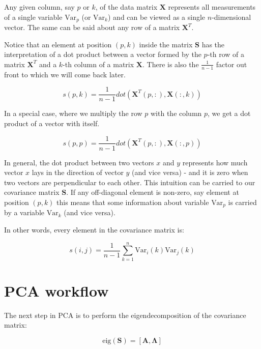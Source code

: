 \documentclass[10pt,twocolumn]{article}
\begin{document}
Any given column, say $p$ or $k$, of the data matrix $\bm{X}$ represents all measurements of a single variable $\text{Var}_p$ (or $\text{Var}_k$) and can be viewed as a single $n$-dimensional vector. The same can be said about any row of a matrix $\bm{X}^T$.

Notice that an element at position $(p,k)$ inside the matrix $\bm{S}$ has the interpretation of a dot product between a vector formed by the $p$-th row of a matrix $\bm{X}^T$ and a $k$-th column of a matrix $\bm{X}$. There is also the $\frac{1}{n-1}$ factor out front to which we will come back later.

\begin{equation}
s(p,k) = \frac{1}{n-1} dot( \bm{X}^T(p, :), \bm{X}(:,k))
\end{equation}

In a special case, where we multiply the row $p$ with the column $p$, we get a dot product of a vector with itself.

\begin{equation}
s(p,p) = \frac{1}{n-1} dot( \bm{X}^T(p, :), \bm{X}(:,p))
\end{equation}

In general, the dot product between two vectors $x$ and $y$ represents how much vector $x$ lays in the direction of vector $y$ (and vice versa) - and it is zero when two vectors are perpendicular to each other. This intuition can be carried to our covariance matrix $\bm{S}$. If any off-diagonal element is non-zero, say element at position $(p,k)$ this means that some information about variable $\text{Var}_p$ is carried by a variable $\text{Var}_k$ (and vice versa).

In other words, every element in the covariance matrix is:

\begin{equation}
s(i,j) = \frac{1}{n-1} \sum\limits_{k=1}^n \text{Var}_i(k) \text{Var}_j(k)
\end{equation}



\section{PCA workflow}

The next step in PCA is to perform the eigendecomposition of the covariance matrix:

\begin{equation} \label{eq:eig-dec}
\text{eig}(\bm{S}) = [\bm{A}, \bm{\Lambda}]
\end{equation}
\end{document}

